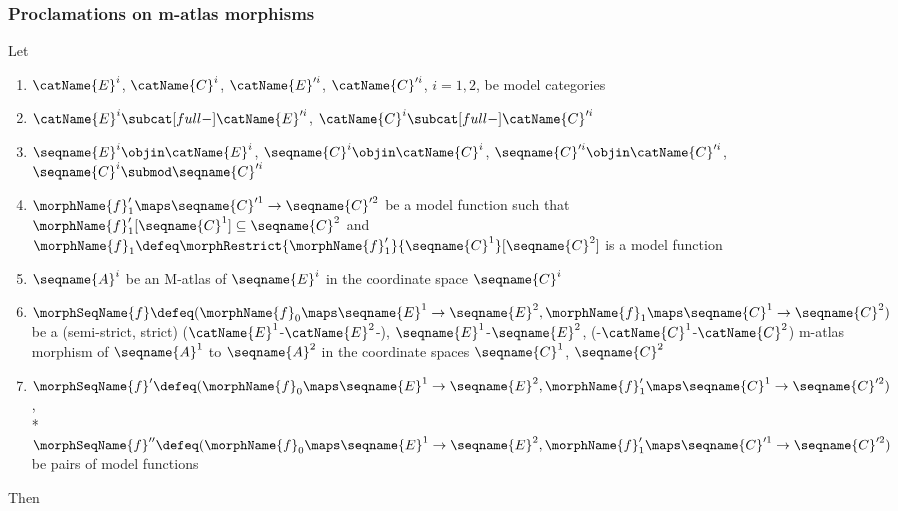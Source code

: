 \documentclass{article}
\begin{document}
\subsubsection{Proclamations on m-atlas morphisms}
\begin{lemma}
\label{lem:M-ATLmorph}
Let
\begin{enumerate}
\item
$\catName{E}^i$, $\catName{C}^i$,
$\catName{E}'^i$, $\catName{C}'^i$, $i=1,2$, be model categories

\item
$\catName{E}^i \subcat[full-] \catName{E}'^i$,
$\catName{C}^i \subcat[full-] \catName{C}'^i$

\item
$\seqname{E}^i \objin \catName{E}^i$,
$\seqname{C}^i \objin \catName{C}^i$,
$\seqname{C}'^i \objin \catName{C}'^i$,
$\seqname{C}^i \submod \seqname{C}'^i$

\item
$\morphName{f}'_1 \maps \seqname{C}'^1 \to \seqname{C}'^2$ be a model
function such that
$\morphName{f}'_1[\seqname{C}^1] \subseteq \seqname{C}^2$ and
$
  \morphName{f}_1 \defeq
  \morphRestrict{\morphName{f}'_1}{\seqname{C}^1}[\seqname{C}^2]
$
is a model function

\item
$\seqname{A}^i$ be an M-atlas
of $\seqname{E}^i$ in the coordinate space $\seqname{C}^i$

\item
$
  \morphSeqName{f} \defeq
  (
    \morphName{f}_0 \maps \seqname{E}^1 \to \seqname{E}^2,
    \morphName{f}_1 \maps \seqname{C}^1 \to \seqname{C}^2
  )
$
be a (semi-strict, strict)
\nobreaks
  {
    {($\catName{E}^1$-$\catName{E}^2$-)},
    {$\seqname{E}^1$-$\seqname{E}^2$},
    {(-$\catName{C}^1$-$\catName{C}^2$)}
  }
m-atlas morphism of $\seqname{A}^1$ to $\seqname{A}^2$ in the
coordinate spaces $\seqname{C}^1$, $\seqname{C}^2$

\item
$
  \morphSeqName{f}' \defeq
  (
    \morphName{f}_0 \maps \seqname{E}^1 \to \seqname{E}^2,
    \morphName{f}'_1 \maps \seqname{C}^1 \to \seqname{C}'^2
  )
$, \\*
$
  \morphSeqName{f}'' \defeq
  (
    \morphName{f}_0 \maps \seqname{E}^1 \to \seqname{E}^2,
    \morphName{f}'_1 \maps \seqname{C}'^1 \to \seqname{C}'^2
  )
$
be pairs of model functions
\end{enumerate}

Then


\end{lemma}
\end{document}
